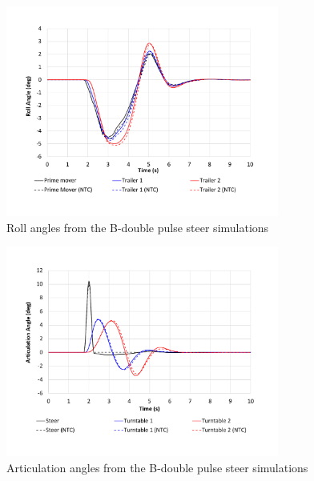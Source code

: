     \begin{figure}[H]
        \centering
        \includegraphics[width=0.8\textwidth]{fig/ntc-b-double_psi}
        \caption{Roll angles from the B-double pulse steer simulations}
        \label{figure:ntc-b-double_psi}
    \end{figure}

    \begin{figure}[H]
        \centering
        \includegraphics[width=0.8\textwidth]{fig/ntc-b-double_psj}
        \caption{Articulation angles from the B-double pulse steer simulations}
        \label{figure:ntc-b-double_psj}
    \end{figure}

